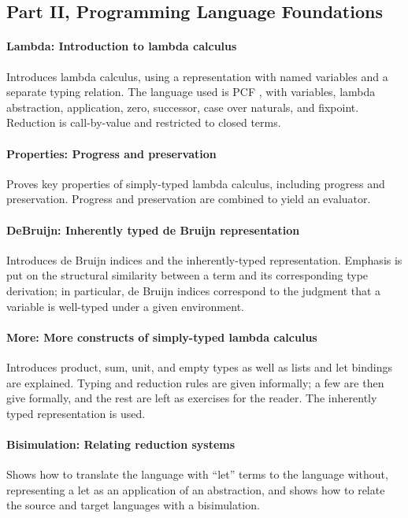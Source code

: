 \documentclass[preprint,authoryear]{elsarticle}
\begin{document}
\subsection*{Part II, Programming Language Foundations}

\paragraph{Lambda: Introduction to lambda calculus}
Introduces lambda calculus, using a representation with named
variables and a separate typing relation. The language used is PCF
\citep{Plotkin-1977}, with variables, lambda abstraction, application,
zero, successor, case over naturals, and fixpoint. Reduction is
call-by-value and restricted to closed terms.

\paragraph{Properties: Progress and preservation}
Proves key properties of simply-typed
lambda calculus, including progress and preservation.  Progress and
preservation are combined to yield an evaluator.

\paragraph{DeBruijn: Inherently typed de Bruijn representation}
Introduces de Bruijn indices and the inherently-typed representation.
Emphasis is put on the structural similarity between a term and its
corresponding type derivation; in particular, de Bruijn indices
correspond to the judgment that a variable is well-typed under a given
environment.

\paragraph{More: More constructs of simply-typed lambda calculus}
Introduces product, sum, unit, and empty types as well as lists and let bindings
are explained.  Typing and reduction rules are given informally; a few
are then give formally, and the rest are left as exercises for the reader.
The inherently typed representation is used.

\paragraph{Bisimulation: Relating reduction systems}
Shows how to translate the language with ``let'' terms
to the language without, representing a let as an application of an abstraction,
and shows how to relate the source and target languages with a bisimulation.
\end{document}
